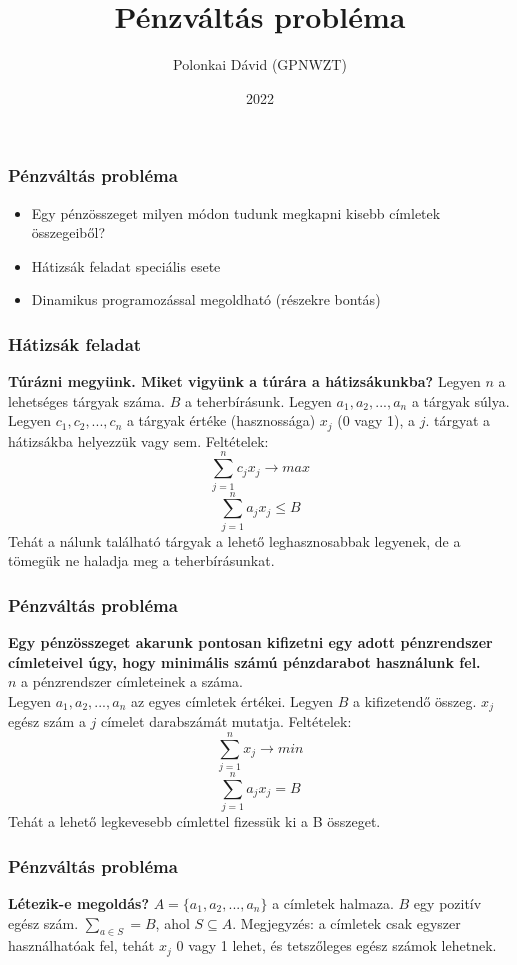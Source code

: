 \documentclass{beamer}
\title{Pénzváltás probléma}
\author{Polonkai Dávid (GPNWZT)}
\institute{Miskolci Egyetem}
\date{2022}
\begin{document}
\frame{\titlepage}

\begin{frame}
\frametitle{Pénzváltás probléma}
\begin{itemize}
    \item Egy pénzösszeget milyen módon tudunk megkapni kisebb címletek összegeiből?
    \item Hátizsák feladat speciális esete
    \item Dinamikus programozással megoldható (részekre bontás)
\end{itemize}

\end{frame}
\begin{frame}
    \frametitle{Hátizsák feladat}
    \textbf{Túrázni megyünk. Miket vigyünk a túrára a hátizsákunkba?}
    Legyen \(n\) a lehetséges tárgyak száma. \newline
    \(B\) a teherbírásunk. \newline
    Legyen \(a_1,a_2,...,a_n\) a tárgyak súlya.\newline
    Legyen \(c_1,c_2,...,c_n\) a tárgyak értéke (hasznossága)\newline
    \(x_j\) (0 vagy 1), a \(j\). tárgyat a hátizsákba helyezzük vagy sem.\newline  
    Feltételek:  
    \[\sum_{j=1}^{n}c_j x_j \rightarrow max\]
    \[\sum_{j=1}^{n}a_j x_j \le B\]
    Tehát a nálunk található tárgyak a lehető leghasznosabbak legyenek, de a tömegük ne haladja meg a teherbírásunkat.
\end{frame}
\begin{frame}
    \frametitle{Pénzváltás probléma}
    \textbf{Egy pénzösszeget akarunk pontosan kifizetni egy adott pénzrendszer címleteivel úgy,
    hogy minimális számú pénzdarabot használunk fel.}\\
    \(n\) a pénzrendszer címleteinek a száma.\\
    Legyen \(a_1,a_2,...,a_n\) az egyes címletek értékei.\newline
    Legyen \(B\) a kifizetendő összeg.\newline
    \(x_j\) egész szám a \(j\) címelet darabszámát mutatja.\newline  
    Feltételek:  
    \[\sum_{j=1}^{n}x_j \rightarrow min\]
    \[\sum_{j=1}^{n}a_j x_j = B\]
    Tehát a lehető legkevesebb címlettel fizessük ki a B összeget.
\end{frame}
\begin{frame}
    \frametitle{Pénzváltás probléma}
    \textbf{Létezik-e megoldás?}  \newline
    \(A = \{a_1,a_2,...,a_n\}\) a címletek halmaza.\newline
    \(B\) egy pozitív egész szám.\newline
    \(\sum_{a \in S} = B\), ahol \(S \subseteq A\).\newline
    Megjegyzés: a címletek csak egyszer használhatóak fel, tehát \(x_j\) 0 vagy 1 lehet, és tetszőleges egész számok lehetnek.\newline
\end{frame}
\end{document}
